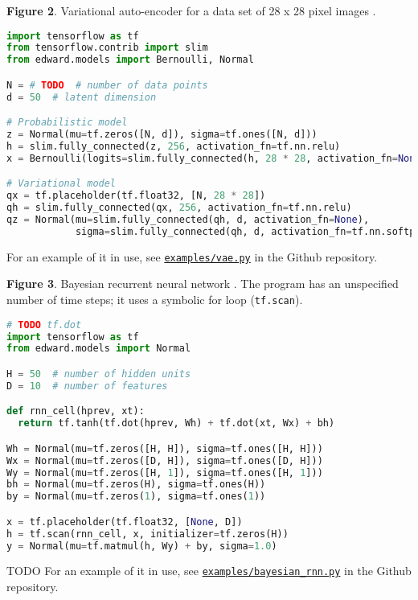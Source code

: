 \textbf{Figure 2}. Variational auto-encoder for a data set of 28 x 28 pixel images
\citep{kingma2014auto,rezende2014stochastic}.
\begin{lstlisting}[language=python]
import tensorflow as tf
from tensorflow.contrib import slim
from edward.models import Bernoulli, Normal

N = # TODO  # number of data points
d = 50  # latent dimension

# Probabilistic model
z = Normal(mu=tf.zeros([N, d]), sigma=tf.ones([N, d]))
h = slim.fully_connected(z, 256, activation_fn=tf.nn.relu)
x = Bernoulli(logits=slim.fully_connected(h, 28 * 28, activation_fn=None))

# Variational model
qx = tf.placeholder(tf.float32, [N, 28 * 28])
qh = slim.fully_connected(qx, 256, activation_fn=tf.nn.relu)
qz = Normal(mu=slim.fully_connected(qh, d, activation_fn=None),
            sigma=slim.fully_connected(qh, d, activation_fn=tf.nn.softplus))
\end{lstlisting}
For an example of it in use, see
\href{https://github.com/blei-lab/edward/blob/master/examples/vae.py}{\texttt{examples/vae.py}}
in the Github repository.

\textbf{Figure 3}. Bayesian recurrent neural network \citep{neal2012bayesian}.
The program has an unspecified number of time steps; it uses a
symbolic for loop (\texttt{tf.scan}).
\begin{lstlisting}[language=python]
# TODO tf.dot
import tensorflow as tf
from edward.models import Normal

H = 50  # number of hidden units
D = 10  # number of features

def rnn_cell(hprev, xt):
  return tf.tanh(tf.dot(hprev, Wh) + tf.dot(xt, Wx) + bh)

Wh = Normal(mu=tf.zeros([H, H]), sigma=tf.ones([H, H]))
Wx = Normal(mu=tf.zeros([D, H]), sigma=tf.ones([D, H]))
Wy = Normal(mu=tf.zeros([H, 1]), sigma=tf.ones([H, 1]))
bh = Normal(mu=tf.zeros(H), sigma=tf.ones(H))
by = Normal(mu=tf.zeros(1), sigma=tf.ones(1))

x = tf.placeholder(tf.float32, [None, D])
h = tf.scan(rnn_cell, x, initializer=tf.zeros(H))
y = Normal(mu=tf.matmul(h, Wy) + by, sigma=1.0)
\end{lstlisting}
TODO
For an example of it in use, see
\href{https://github.com/blei-lab/edward/blob/master/examples/bayesian_rnn.py}{\texttt{examples/bayesian_rnn.py}}
in the Github repository.

